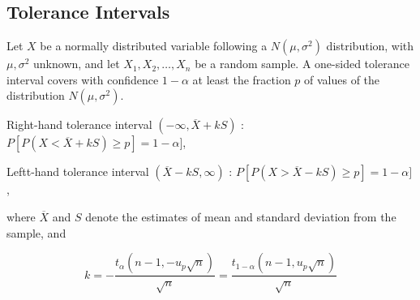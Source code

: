 %
%





\subsection{Tolerance Intervals}
Let $X$ be a normally distributed variable following a $N(\mu,\sigma^2)$ distribution, with $\mu, \sigma^2$ unknown, and let $X_1,X_2,\ldots,X_n$ be a random sample.
A one-sided tolerance interval covers with confidence $1-\alpha$ at least the fraction $p$ of values of the distribution $N(\mu,\sigma^2)$.

Right-hand tolerance interval $(-\infty, \overline{X} + kS)$ : $P[P(X<\overline{X} + kS) \geq p] =1-\alpha]$,

Leftt-hand tolerance interval $(\overline{X} - kS, \infty)$ : $P[P(X>\overline{X} - kS) \geq p] =1-\alpha]$,

where $\overline{X}$ and $S$ denote the estimates of mean and standard deviation from the sample, and 

\begin{equation}
	k=-\frac{t_\alpha(n-1,-u_p \sqrt{n})}{\sqrt{n}} =\frac{t_{1-\alpha}(n-1,u_p \sqrt{n})}{\sqrt{n}}
\end{equation}

